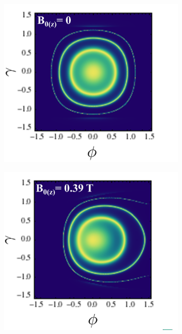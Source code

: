 \begin{figure}[H]
        \begin{subfigure}[b]{0.4\linewidth}
            \includegraphics[width = \linewidth]{fig/Chap 2/anomalous5.png}
            \caption{}
            \label{2fig:anomalous5}
        \end{subfigure}
        \begin{subfigure}[b]{0.4\linewidth}
            \includegraphics[width = \linewidth]{fig/Chap 2/anomalous6.png}

\end{subfigure}
\end{figure}
